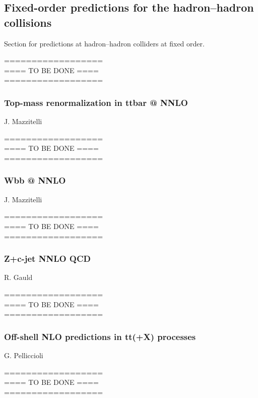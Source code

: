 \documentclass{FBR_Bericht_2025}
\begin{document}
\subsection{Fixed-order predictions for the hadron--hadron collisions}
\begin{refsection}
Section for predictions at hadron--hadron colliders at fixed order.

%
{\color{red} ==================\\ ====\; TO BE DONE\; ====\\ ==================}
%
\subsubsection{Top-mass renormalization in ttbar @ NNLO}
\begin{Namen}
J. Mazzitelli
\end{Namen}
%
{\color{red} ==================\\ ====\; TO BE DONE\; ====\\ ==================}
%
\subsubsection{Wbb @ NNLO}
\begin{Namen}
J. Mazzitelli
\end{Namen}
%
{\color{red} ==================\\ ====\; TO BE DONE\; ====\\ ==================}
%
\subsubsection{Z+c-jet NNLO QCD}
\begin{Namen}
R. Gauld
\end{Namen}
%
{\color{red} ==================\\ ====\; TO BE DONE\; ====\\ ==================}
%
\subsubsection{Off-shell NLO predictions in tt(+X) processes}
\begin{Namen}
G. Pelliccioli
\end{Namen}
%
{\color{red} ==================\\ ====\; TO BE DONE\; ====\\ ==================}
%
\printbibliography[heading=subbibliography]
\end{refsection}
\end{document}
